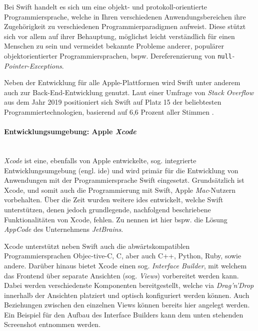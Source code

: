 Bei Swift handelt es sich um eine objekt- und protokoll-orientierte Programmiersprache, welche in Ihren verschiedenen Anwendungsbereichen ihre Zugehörigkeit zu verschiedenen Programmierparadigmen aufweist. Diese stützt sich vor allem auf ihrer Behauptung, möglichst leicht verständlich für einen Menschen zu sein \cite{AppleSwift} und vermeidet bekannte Probleme anderer, populärer objektorientierter Programmiersprachen, bspw. Dereferenzierung von \texttt{null}\textit{-Pointer-Exceptions}.

Neben der Entwicklung für alle Apple-Plattformen wird Swift unter anderem auch zur Back-End-Entwicklung genutzt. Laut einer Umfrage von \textit{Stack Overflow} aus dem Jahr 2019 positioniert sich Swift auf Platz 15 der beliebtesten Programmiertechnologien, basierend auf 6,6 Prozent aller Stimmen \cite{noauthor_stack_nodate}.

\paragraph{Entwicklungsumgebung: Apple \textit{Xcode}}\mbox{}\\
\textit{Xcode} ist eine, ebenfalls von Apple entwickelte, sog. integrierte Entwicklungsumgebung (engl. \ac{ide}) und wird primär für die Entwicklung von Anwendungen mit der Programmiersprache Swift eingesetzt. Grundsätzlich ist Xcode, und somit auch die Programmierung mit Swift, Apple \textit{Mac}-Nutzern vorbehalten. Über die Zeit wurden weitere \acp{ide} entwickelt, welche Swift unterstützen, denen jedoch grundlegende, nachfolgend beschriebene Funktionalitäten von Xcode, fehlen. Zu nennen ist hier bspw. die Lösung \textit{AppCode} des Unternehmens \textit{JetBrains}.

Xcode unterstützt neben Swift auch die abwärtskompatiblen Programmiersprachen Objec-tive-C, C, aber auch C++, Python, Ruby, sowie andere. Darüber hinaus bietet Xcode einen sog. \textit{Interface Builder}, mit welchem das Frontend über separate Ansichten (sog. \textit{Views}) vorbereitet werden kann. Dabei werden verschiedenste Komponenten bereitgestellt, welche via \textit{Drag'n'Drop} innerhalb der Ansichten platziert und optisch konfiguriert werden können. Auch Beziehungen zwischen den einzelnen Views können bereits hier angelegt werden. Ein Beispiel für den Aufbau des Interface Builders kann dem unten stehenden Screenshot entnommen werden.

